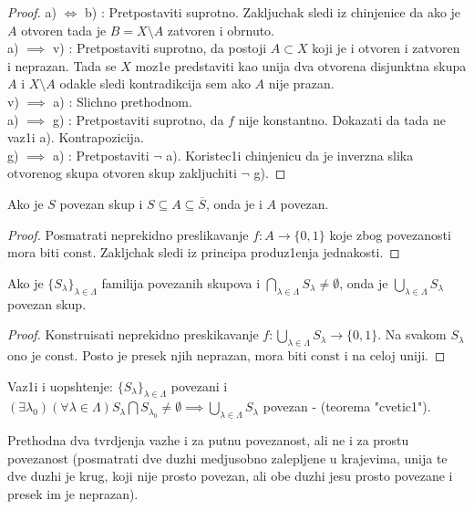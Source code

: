 \documentclass[a4paper,12pt]{article}
\newcommand{\psj}{\subseteq}
\newcommand{\const}{\mathrm{const}}
\begin{document}
\begin{proof}
a) $\Leftrightarrow$ b) : Pretpostaviti suprotno. Zakljuchak sledi iz chinjenice da ako je $A$ otvoren tada je $B = X \setminus A$ zatvoren i obrnuto. \\ 
a) $\implies$ v) : Pretpostaviti suprotno, da postoji $A \subset X$ koji je i otvoren i zatvoren i neprazan. Tada se $X$ moz1e predstaviti kao unija dva otvorena disjunktna skupa $A$ i $X \setminus A$ odakle sledi kontradikcija sem ako $A$ nije prazan.
\\ 
v) $\implies$ a) : Slichno prethodnom.
\\
a) $\implies$ g) : Pretpostaviti suprotno, da $f$ nije konstantno. Dokazati da tada ne vaz1i a). Kontrapozicija.
\\
g) $\implies$ a) : Pretpostaviti $\neg$ a). Koristec1i chinjenicu da je inverzna slika otvorenog skupa otvoren skup zakljuchiti $\neg$ g).
\end{proof}

\begin{tvr}
Ako je $S$ povezan skup i $S \psj A \psj \overline{S}$, onda je i $A$ povezan.
\end{tvr}
\begin{proof}
Posmatrati neprekidno preslikavanje $f: A \to \{0, 1\}$ koje zbog povezanosti mora biti $\const$. Zakljchak sledi iz principa produz1enja jednakosti.
\end{proof}

\begin{tvr}
Ako je $\{S_{\lambda}\}_{\lambda \in \Lambda}$ familija povezanih skupova i $\bigcap_{\lambda \in \Lambda} S_{\lambda} \ne \emptyset$, onda je $\bigcup_{\lambda \in \Lambda} S_{\lambda}$ povezan skup.
\end{tvr}
\begin{proof}
Konstruisati neprekidno preskikavanje $f: \bigcup_{\lambda \in \Lambda} S_{\lambda} \to \{ 0, 1 \}$. Na svakom $S_\lambda$ ono je $\const$. Posto je presek njih neprazan, mora biti $\const$ i na celoj uniji.
\end{proof}

\begin{nap}
Vaz1i i uopshtenje: $\{S_{\lambda}\}_{\lambda \in \Lambda}$ povezani i $(\exists \lambda_0) (\forall \lambda \in \Lambda) S_{\lambda} \bigcap S_{\lambda_0} \ne \emptyset \implies \bigcup_{\lambda \in \Lambda} S_{\lambda}$ povezan - (teorema "cvetic1").
\end{nap}

\begin{nap}
	Prethodna dva tvrdjenja vazhe i za putnu povezanost, ali ne i za prostu povezanost (posmatrati dve duzhi medjusobno zalepljene u krajevima, unija te dve duzhi
	je krug, koji nije prosto povezan, ali obe duzhi jesu prosto povezane i presek im je neprazan).
\end{nap}
\end{document}
